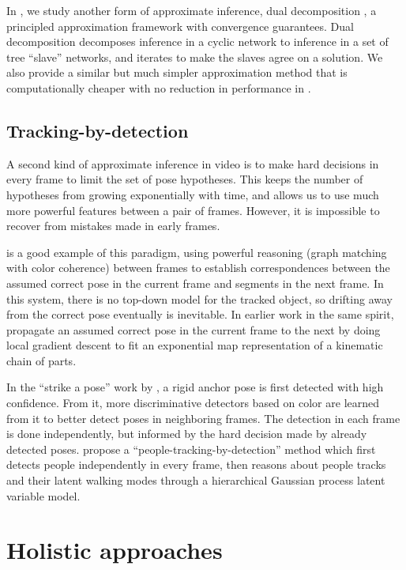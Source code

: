 In , we study another form of approximate inference, dual 
decomposition \citep{komodakis2007}, a principled approximation framework with 
convergence guarantees.  Dual decomposition decomposes inference in a cyclic 
network to inference in a set of tree ``slave'' networks, and iterates to make 
the slaves agree on a solution.  We also provide a similar but much simpler 
approximation method that is computationally cheaper with no reduction in 
performance in .


\subsection{Tracking-by-detection}  A second kind of approximate inference in 
video is to make hard decisions in every frame to limit the set of pose 
hypotheses.  This keeps the number of hypotheses from growing exponentially 
with time, and allows us to use much more powerful features between a pair of 
frames.  However, it is impossible to recover from mistakes made in early 
frames.

\citet{ren07} is a good example of this paradigm, using powerful reasoning 
(graph matching with color coherence) between frames to establish 
correspondences between the assumed correct pose in the current frame and 
segments in the next frame.  In this system, there is no top-down model for the 
tracked object, so drifting away from the correct pose eventually is 
inevitable.  In earlier work in the same spirit, \citet{bregler98} propagate an 
assumed correct pose in the current frame to the next by doing local gradient 
descent to fit an exponential map representation of a kinematic chain of parts.

In the ``strike a pose'' work by \citet{strikeapose}, a rigid anchor pose is 
first detected with high confidence.  From it, more discriminative detectors 
based on color are learned from it to better detect poses in neighboring 
frames.  The detection in each frame is done independently, but informed by the 
hard decision made by already detected poses. \citet{andriluka2008people} 
propose a ``people-tracking-by-detection'' method which first detects people 
independently in every frame, then reasons about people tracks and their latent 
walking modes through a hierarchical Gaussian process latent variable model.



\section{Holistic approaches}\label{sec:nonpart}

